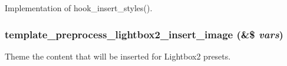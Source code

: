Implementation of hook\_\-insert\_\-styles(). \hypertarget{lightbox2_8insert_8inc_564252d15033d955b2a2f77947a5b1f2}{
\subsubsection[{template\_\-preprocess\_\-lightbox2\_\-insert\_\-image}]{\setlength{\rightskip}{0pt plus 5cm}template\_\-preprocess\_\-lightbox2\_\-insert\_\-image (\&\$ {\em vars})}}
\label{lightbox2_8insert_8inc_564252d15033d955b2a2f77947a5b1f2}


Theme the content that will be inserted for Lightbox2 presets. 